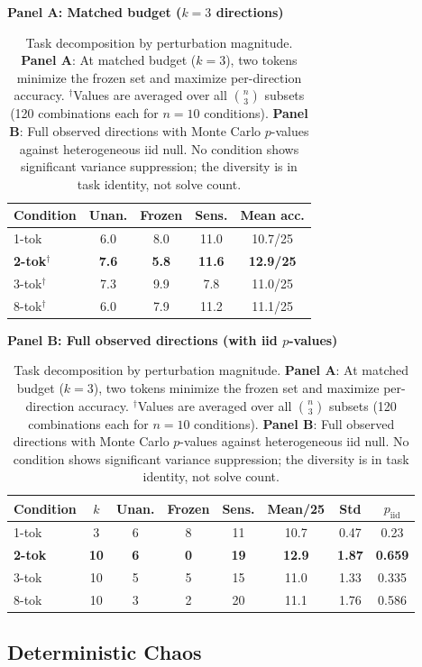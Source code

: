 \documentclass{article}
\begin{document}
\begin{table}[h]
\centering
\textbf{Panel A: Matched budget ($k = 3$ directions)}

\medskip
\begin{tabular}{lcccc}
\toprule
\textbf{Condition} & \textbf{Unan.} & \textbf{Frozen} & \textbf{Sens.} & \textbf{Mean acc.} \\
\midrule
1-tok & 6.0 & 8.0 & 11.0 & 10.7/25 \\
\textbf{2-tok}$^\dagger$ & \textbf{7.6} & \textbf{5.8} & \textbf{11.6} & \textbf{12.9/25} \\
3-tok$^\dagger$ & 7.3 & 9.9 & 7.8 & 11.0/25 \\
8-tok$^\dagger$ & 6.0 & 7.9 & 11.2 & 11.1/25 \\
\bottomrule
\end{tabular}

\medskip
\textbf{Panel B: Full observed directions (with iid $p$-values)}

\medskip
\begin{tabular}{lccccccc}
\toprule
\textbf{Condition} & $k$ & \textbf{Unan.} & \textbf{Frozen} & \textbf{Sens.} & \textbf{Mean/25} & \textbf{Std} & $p_{\text{iid}}$ \\
\midrule
1-tok & 3 & 6 & 8 & 11 & 10.7 & 0.47 & 0.23 \\
\textbf{2-tok} & \textbf{10} & \textbf{6} & \textbf{0} & \textbf{19} & \textbf{12.9} & \textbf{1.87} & \textbf{0.659} \\
3-tok & 10 & 5 & 5 & 15 & 11.0 & 1.33 & 0.335 \\
8-tok & 10 & 3 & 2 & 20 & 11.1 & 1.76 & 0.586 \\
\bottomrule
\end{tabular}
\caption{Task decomposition by perturbation magnitude.
\textbf{Panel A}: At matched budget ($k = 3$), two tokens minimize the
frozen set and maximize per-direction accuracy.
$^\dagger$Values are averaged over all $\binom{n}{3}$ subsets
(120 combinations each for $n = 10$ conditions).
\textbf{Panel B}: Full observed directions with Monte Carlo
$p$-values against heterogeneous iid null. No condition shows
significant variance suppression; the diversity is in task identity,
not solve count.}
\label{tab:equalization}
\end{table}

\subsection{Deterministic Chaos} %
\label{sec:chaos}
\end{document}
